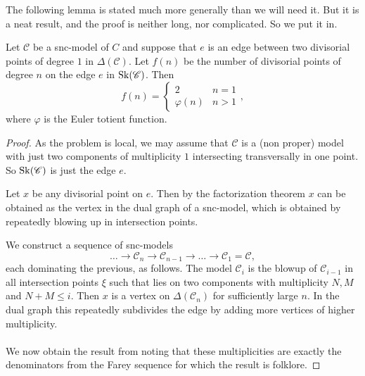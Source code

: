 The following lemma is stated much more generally than we will need it. 
But it is a neat result, and the proof is neither long, nor complicated. So we put it in. 
\begin{lemma}\label{lem:number_divisorial_points}
	Let $\mathscr C$ be a snc-model of  $C$ and suppose that $e$ is an edge between two divisorial points of degree $1$ in $\Delta(\mathscr C)$. 
	Let $f(n)$ be the number of divisorial points of degree $n$ on the edge  $e$ in $\operatorname{Sk}(\mathscr C)$. 
	Then \[
		f(n) = \begin{cases}
			2 & n = 1 \\
			\varphi(n) & n > 1
		\end{cases}
	,\] 
	where $\varphi$ is the Euler totient function. 
\end{lemma}
\begin{proof}
	As the problem is local, we may assume that $\mathscr C$ is a (non proper) model with just two components of multiplicity $1$ intersecting transversally in one point. 
	So $\operatorname{Sk}(\mathscr C)$ is just the edge $e$. 

	Let $x$ be any divisorial point on $e$. 
	Then by the factorization theorem $x$ can be obtained as the vertex in the dual graph of a snc-model, which is obtained by repeatedly blowing up in intersection points. 

	We construct a sequence of snc-models \[
	\ldots \to 	\mathscr C_n \to \mathscr C_{n -1} \to \ldots \to \mathscr C_1 = \mathscr C
,\]
each dominating the previous, as follows. 
The model  $\mathscr C_i$ is the blowup of $\mathscr C_{i-1}$ in all intersection points $\xi$ such that lies on two components with multiplicity $N, M$ and $N + M \le i$. 
Then $x$ is a vertex on $\Delta(\mathscr C_n)$ for sufficiently large $n$.
In the dual graph this repeatedly subdivides the edge by adding more vertices of higher multiplicity. 
\\
\noindent{}
\\
We now obtain the result from noting that these multiplicities are exactly the denominators from the Farey sequence for which the result is folklore. 
\end{proof}


